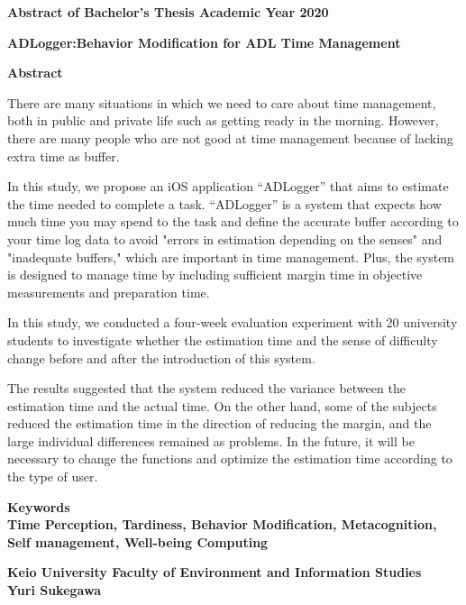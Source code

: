 \begin{center}
\textbf{\large Abstract of Bachelor's Thesis Academic Year 2020}

\vspace{6mm}

\textbf{\large ADLogger:Behavior Modification for ADL Time Management}
\end{center}

\vspace{10mm}


\begin{flushleft}
\textbf{Abstract}\\
\end{flushleft}

There are many situations in which we need to care about time management, both in public and private life such as getting ready in the morning.
However, there are many people who are not good at time management because of lacking extra time as buffer.

In this study, we propose an iOS application  “ADLogger” that aims to estimate the time needed to complete a task.
“ADLogger” is a system that expects how much time you may spend to the task and define the accurate buffer according to your time log data to avoid "errors in estimation depending on the senses" and "inadequate buffers," which are important in time management.
Plus, the system is designed to manage time by including sufficient margin time in objective measurements and preparation time.

In this study, we conducted a four-week evaluation experiment with 20 university students to investigate whether the estimation time and the sense of difficulty change before and after the introduction of this system.

The results suggested that the system reduced the variance between the estimation time and the actual time.
On the other hand, some of the subjects reduced the estimation time in the direction of reducing the margin, and the large individual differences remained as problems.
In the future, it will be necessary to change the functions and optimize the estimation time according to the type of user.

\begin{flushleft}
\textbf{Keywords}\\
\textbf{ Time Perception, Tardiness, Behavior Modification, Metacognition, Self management, Well-being Computing}
\end{flushleft}

\begin{flushright}
\textbf{Keio University Faculty of Environment and Information Studies}\\
\textbf{Yuri Sukegawa}\\
\end{flushright}